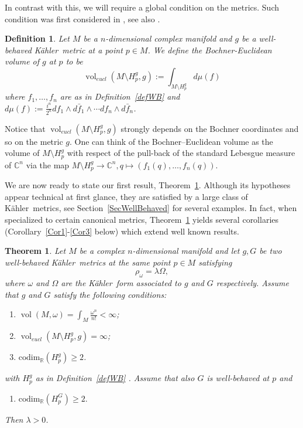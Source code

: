 \documentclass[12pt]{amsart}
\newcommand{\R}{\mathbb{R}}
\newcommand{\codim}{\mathrm{codim}}
\newcommand{\C}{\mathbb{C}}
\newcommand{\K}{K\"{a}hler}
\newcommand{\vol}{{\operatorname{vol}}}
\newtheorem{theor}{Theorem}
\newtheorem{defin}{Definition}
\begin{document}
In contrast with this, we will require a global condition on the metrics. Such condition was first considered in \cite{ArezzoLoi04EuclideanVolume}, see also \cite{ArezzoLoiZuddas16Toric}. 
\begin{defin}\label{defvoleucl}\rm
Let $M$ be a $n$-dimensional complex manifold and  $g$ be a well-behaved \K\ metric at a point $p\in M$. 
We define the {\em Bochner-Euclidean volume} of $g$ at $p$ to be
\begin{equation}\label{voleucl}
\vol_{eucl} (M\setminus H_p^g, g):=\int_{M\setminus H_p^g}d\mu(f)
\end{equation}
where $f_1, \dots , f_n$ are as in Definition~\ref{defWB} and $d\mu (f):=\frac{i^n}{2^n}df_1\wedge d\bar f_1\wedge\cdots df_n\wedge d\bar f_n$.
\end{defin}
Notice that  $\vol_{eucl} (M\setminus H_p^g, g)$
strongly depends on the Bochner coordinates
and so on the metric $g$.
One can think of the Bochner--Euclidean volume 
as the volume of $M\setminus H_p^g$
with respect of  the pull-back of the standard Lebesgue measure of $\C^n$
via  the map $M\setminus H_p^g\rightarrow \C^n, q\mapsto (f_1(q), \dots , f_n(q))$.

We are now ready to state our first result, Theorem~\ref{mainteor}. 
Although its hypotheses appear technical at first glance, they are satisfied by a large class of \K\ metrics, see Section~\ref{SecWellBehaved} for several examples.
In fact, when specialized to certain canonical metrics, Theorem~\ref{mainteor} yields several corollaries (Corollary~\ref{Cor1}-\ref{Cor3} below) which extend well known results.
\begin{theor}\label{mainteor}
Let $M$ be a complex $n$-dimensional manifold and let  $g, G$ be two well-behaved   \K\ metrics at the same point  $p\in M$ satisfying
\begin{equation*}
\rho_\omega=\lambda\Omega,
\end{equation*}
where $\omega$ and $\Omega$ are the \K\ form associated 
to $g$ and $G$ respectively.
Assume that $g$ and $G$ satisfy the following conditions:
\begin{enumerate}
\item [(i)]
$\vol (M, \omega)=\int_M\frac{\omega^n}{n!}<\infty$;
\item [(ii)]
$\vol_{eucl} (M\setminus H_p^g, g)=\infty$;
\item [(iii)]
$\codim_{\R}(H_p^g)\geq 2$.
\end{enumerate}
with $H_p^g$  as in Definition~\ref{defWB} .
Assume that also  $G$ is well-behaved at $p$ and 
\begin{enumerate}
\item [(iv)]
$\codim_{\R}(H_p^G)\geq 2.$
\end{enumerate}

Then  
$\lambda >0$.
\end{theor}
\end{document}

